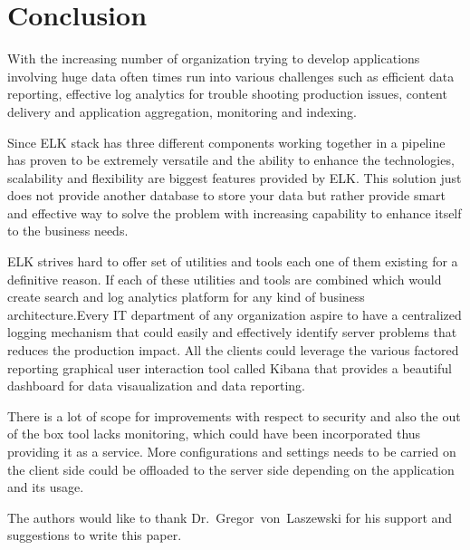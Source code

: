 \section{Conclusion}

With the increasing number of organization trying to develop applications 
involving huge data often times run into various challenges such as efficient 
data reporting, effective log analytics for trouble shooting production issues, 
content delivery and application aggregation, monitoring and indexing.

Since ELK stack has three different components working together in a pipeline 
has proven to be extremely versatile and the ability to enhance the 
technologies, scalability and flexibility are biggest features provided by ELK\@. 
This solution just does not provide another database to store your data but 
rather provide smart and effective way to solve the problem with increasing 
capability to enhance itself to the business needs.

ELK strives hard to offer set of utilities and tools each one of them existing 
for a definitive reason. If each of these utilities and tools are combined which
would create search and log analytics platform for any kind of business 
architecture.Every IT department of any organization aspire to have a 
centralized logging mechanism that could easily and effectively identify server
problems that reduces the production impact. All the clients could leverage the
various factored reporting graphical user interaction tool called Kibana that 
provides a beautiful dashboard for data visaualization and data reporting.

There is a lot of scope for improvements with respect to security and also the 
out of the box tool lacks monitoring, which could have been incorporated thus 
providing it as a service. More configurations and settings needs to be carried 
on the client side could be offloaded to the server side depending on the 
application and its usage. 



\begin{acks}

  The authors would like to thank Dr.~Gregor~von~Laszewski for his
  support and suggestions to write this paper.

\end{acks}


 


